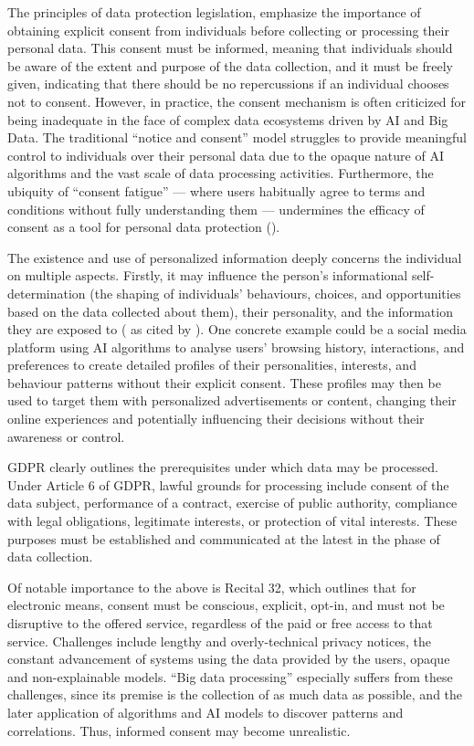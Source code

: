 \documentclass{article}
\begin{document}
The principles of data protection legislation, emphasize the importance of obtaining explicit consent from individuals before collecting or processing their personal data. This consent must be informed, meaning that individuals should be aware of the extent and purpose of the data collection, and it must be freely given, indicating that there should be no repercussions if an individual chooses not to consent. However, in practice, the consent mechanism is often criticized for being inadequate in the face of complex data ecosystems driven by AI and Big Data. The traditional “notice and consent” model struggles to provide meaningful control to individuals over their personal data due to the opaque nature of AI algorithms and the vast scale of data processing activities. Furthermore, the ubiquity of “consent fatigue” — where users habitually agree to terms and conditions without fully understanding them — undermines the efficacy of consent as a tool for personal data protection (\cite{MANTELERO2018754}).

The existence and use of personalized information deeply concerns the individual on multiple aspects. Firstly, it may influence the person's informational self-determination (the shaping of individuals' behaviours, choices, and opportunities based on the data collected about them), their personality, and the information they are exposed to (\cite{andrade2010, conrad2017, hildebrandt2008} as cited by \cite{mitrou}). One concrete example could be a social media platform using AI algorithms to analyse users' browsing history, interactions, and preferences to create detailed profiles of their personalities, interests, and behaviour patterns without their explicit consent. These profiles may then be used to target them with personalized advertisements or content, changing their online experiences and potentially influencing their decisions without their awareness or control.

GDPR clearly outlines the prerequisites under which data may be processed. Under Article 6 of GDPR, lawful grounds for processing include consent of the data subject, performance of a contract, exercise of public authority, compliance with legal obligations, legitimate interests, or protection of vital interests. These purposes must be established and communicated at the latest in the phase of data collection.

Of notable importance to the above is Recital 32, which outlines that for electronic means, consent must be conscious, explicit, opt-in, and must not be disruptive to the offered service, regardless of the paid or free access to that service. Challenges include lengthy and overly-technical privacy notices, the constant advancement of systems using the data provided by the users, opaque and non-explainable models. “Big data processing” especially suffers from these challenges, since its premise is the collection of as much data as possible, and the later application of algorithms and AI models to discover patterns and correlations. Thus, informed consent may become unrealistic.
\end{document}
